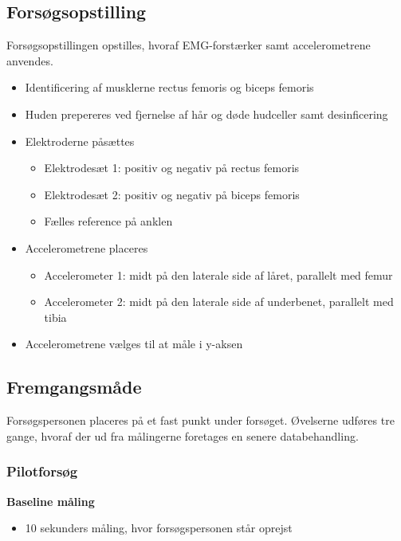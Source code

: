 

\subsection{Forsøgsopstilling}
Forsøgsopstillingen opstilles, hvoraf EMG-forstærker samt accelerometrene anvendes. 

\begin{itemize}
\item Identificering af musklerne rectus femoris og biceps femoris 
\item Huden prepereres ved fjernelse af hår og døde hudceller samt desinficering 
\item Elektroderne påsættes
	\begin{itemize}
	\item Elektrodesæt 1: positiv og negativ på rectus femoris
	\item Elektrodesæt 2: positiv og negativ på biceps femoris
	\item Fælles reference på anklen
	\end{itemize} 
\item Accelerometrene placeres 
	\begin{itemize}
	\item Accelerometer 1: midt på den laterale side af låret, parallelt med femur
	\item Accelerometer 2: midt på den laterale side af underbenet, parallelt med tibia 
	\end{itemize}
\item Accelerometrene vælges til at måle i y-aksen
\end{itemize}

\subsection{Fremgangsmåde}
Forsøgspersonen placeres på et fast punkt under forsøget. Øvelserne udføres tre gange, hvoraf der ud fra målingerne foretages en senere databehandling. 

\subsubsection{Pilotforsøg}
\textbf{Baseline måling}
\begin{itemize}
\item 10 sekunders måling, hvor forsøgspersonen står oprejst
\end{itemize}

